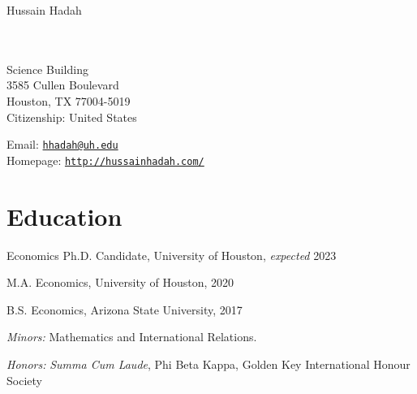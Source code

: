 \documentclass[10pt,letterpaper]{article}
\newcommand{\MYhref}[3][black]{\href{#2}{\color{#1}{#3}}}%
\def\name{Hussain Hadah}
\renewenvironment{itemize}{
  \begin{list}{}{
    \setlength{\leftmargin}{1.5em}
  }
}{
  \end{list}
}
\begin{document}
{\Huge \name}


\vspace{0.25in}

\begin{minipage}[t]{0.5\textwidth}
  \MYhref{https://www.uh.edu/}{University of Houston} \\
  \MYhref{https://www.uh.edu/class/economics/}{Department of Economics} \\
  Science Building \\
  3585 Cullen Boulevard \\
  Houston, TX 77004-5019 \\
  Citizenship: United States
\end{minipage}
\begin{minipage}[t]{0.5\textwidth}
  Email: \href{mailto:hhadah@uh.edu}{\tt hhadah@uh.edu} \\
  Homepage: \href{http://hussainhadah.com/}{\tt http://hussainhadah.com/} \\
\end{minipage}

\section*{Education}

\begin{itemize}
  \item Economics Ph.D. Candidate, University of Houston, \textit{expected} 2023

  \item M.A. Economics, University of Houston, 2020

  \item B.S. Economics, Arizona State University, 2017
    \begin{itemize}
    \item \textit{Minors:} Mathematics and International Relations.
    \item \textit{Honors:} \textit{Summa Cum Laude}, Phi Beta Kappa, Golden 
    Key International Honour Society
    \end{itemize}

\end{itemize}
\end{document}
